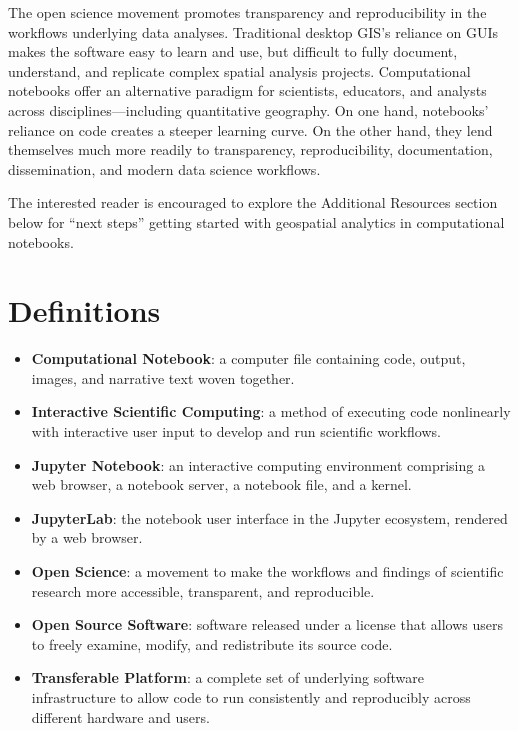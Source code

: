 \documentclass[11pt,letterpaper]{article}
\begin{document}
The open science movement promotes transparency and reproducibility in the workflows underlying data analyses. Traditional desktop GIS's reliance on GUIs makes the software easy to learn and use, but difficult to fully document, understand, and replicate complex spatial analysis projects. Computational notebooks offer an alternative paradigm for scientists, educators, and analysts across disciplines---including quantitative geography. On one hand, notebooks' reliance on code creates a steeper learning curve. On the other hand, they lend themselves much more readily to transparency, reproducibility, documentation, dissemination, and modern data science workflows.

The interested reader is encouraged to explore the Additional Resources section below for \enquote{next steps} getting started with geospatial analytics in computational notebooks.

\setlength{\bibsep}{0.00cm plus 0.05cm}



\section*{Definitions}

\begin{itemize}
	\item \textbf{Computational Notebook}: a computer file containing code, output, images, and narrative text woven together.
	\item \textbf{Interactive Scientific Computing}: a method of executing code nonlinearly with interactive user input to develop and run scientific workflows.
	\item \textbf{Jupyter Notebook}: an interactive computing environment comprising a web browser, a notebook server, a notebook file, and a kernel.
	\item \textbf{JupyterLab}: the notebook user interface in the Jupyter ecosystem, rendered by a web browser.
	\item \textbf{Open Science}: a movement to make the workflows and findings of scientific research more accessible, transparent, and reproducible.
	\item \textbf{Open Source Software}: software released under a license that allows users to freely examine, modify, and redistribute its source code.
	\item \textbf{Transferable Platform}: a complete set of underlying software infrastructure to allow code to run consistently and reproducibly across different hardware and users.
\end{itemize}
\end{document}

